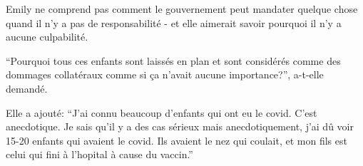 {Emily ne comprend pas comment le gouvernement peut mandater quelque chose quand
il n'y a pas de responsabilité - et elle aimerait savoir pourquoi il n'y a
aucune culpabilité.

“Pourquoi tous ces enfants sont laissés en plan et sont considérés comme des
dommages collatéraux comme si ça n'avait aucune importance?”, a-t-elle demandé.

Elle a ajouté: “J'ai connu beaucoup d'enfants qui ont eu le covid. C'est
anecdotique. Je sais qu'il y a des cas sérieux mais anecdotiquement, j'ai dû
voir 15-20 enfants qui avaient le covid. Ils avaient le nez qui coulait, et mon
fils est celui qui fini à l'hopital à cause du vaccin.”

}
